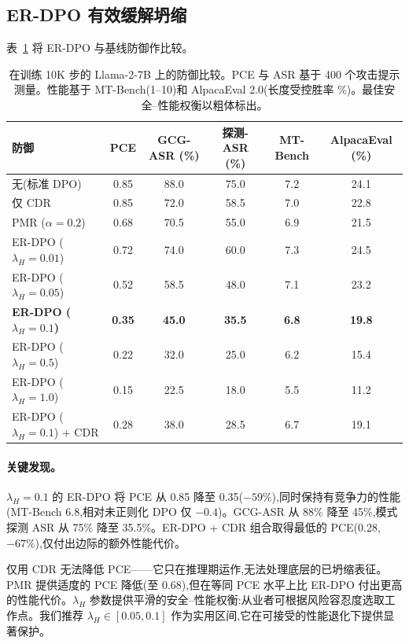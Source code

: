 \subsection{ER-DPO 有效缓解坍缩}
\label{sec:res_defense}

表~\ref{tab:defense} 将 ER-DPO 与基线防御作比较。

\begin{table}[t]
\centering
\caption{在训练 10K 步的 Llama-2-7B 上的防御比较。PCE 与 ASR 基于 400 个攻击提示测量。性能基于 MT-Bench(1--10)和 AlpacaEval 2.0(长度受控胜率 \%)。最佳安全--性能权衡以粗体标出。}
\label{tab:defense}
\small
\begin{tabular}{@{}lccccc@{}}
\toprule
防御 & PCE & GCG-ASR (\%) & 探测-ASR (\%) & MT-Bench & AlpacaEval (\%) \\
\midrule
无(标准 DPO) & 0.85 & 88.0 & 75.0 & 7.2 & 24.1 \\
仅 CDR            & 0.85 & 72.0 & 58.5 & 7.0 & 22.8 \\
PMR ($\alpha = 0.2$) & 0.68 & 70.5 & 55.0 & 6.9 & 21.5 \\
ER-DPO ($\lambda_H = 0.01$) & 0.72 & 74.0 & 60.0 & 7.3 & 24.5 \\
ER-DPO ($\lambda_H = 0.05$) & 0.52 & 58.5 & 48.0 & 7.1 & 23.2 \\
\textbf{ER-DPO ($\lambda_H = 0.1$)} & \textbf{0.35} & \textbf{45.0} & \textbf{35.5} & \textbf{6.8} & \textbf{19.8} \\
ER-DPO ($\lambda_H = 0.5$) & 0.22 & 32.0 & 25.0 & 6.2 & 15.4 \\
ER-DPO ($\lambda_H = 1.0$) & 0.15 & 22.5 & 18.0 & 5.5 & 11.2 \\
\midrule
ER-DPO ($\lambda_H = 0.1$) + CDR & 0.28 & 38.0 & 28.5 & 6.7 & 19.1 \\
\bottomrule
\end{tabular}
\end{table}

\paragraph{关键发现。} $\lambda_H = 0.1$ 的 ER-DPO 将 PCE 从 0.85 降至 0.35($-59\%$),同时保持有竞争力的性能(MT-Bench 6.8,相对未正则化 DPO 仅 $-0.4$)。GCG-ASR 从 88\% 降至 45\%,模式探测 ASR 从 75\% 降至 35.5\%。ER-DPO + CDR 组合取得最低的 PCE(0.28,$-67\%$),仅付出边际的额外性能代价。

仅用 CDR 无法降低 PCE——它只在推理期运作,无法处理底层的已坍缩表征。PMR 提供适度的 PCE 降低(至 0.68),但在等同 PCE 水平上比 ER-DPO 付出更高的性能代价。$\lambda_H$ 参数提供平滑的安全--性能权衡:从业者可根据风险容忍度选取工作点。我们推荐 $\lambda_H \in [0.05, 0.1]$ 作为实用区间,它在可接受的性能退化下提供显著保护。


